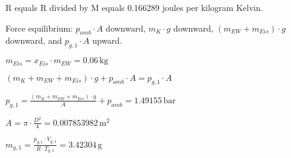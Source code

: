 R equals R divided by M equals 0.166289 joules per kilogram Kelvin.  

Force equilibrium:  
\( p_{amb} \cdot A \) downward, \( m_K \cdot g \) downward, \( (m_{EW} + m_{Eis}) \cdot g \) downward, and \( p_{g,1} \cdot A \) upward.  

\( m_{Eis} = x_{Eis} \cdot m_{EW} = 0.06 \, \text{kg} \)  

\( (m_K + m_{EW} + m_{Eis}) \cdot g + p_{amb} \cdot A = p_{g,1} \cdot A \)  

\( p_{g,1} = \frac{(m_K + m_{EW} + m_{Eis}) \cdot g}{A} + p_{amb} = 1.49155 \, \text{bar} \)  

\( A = \pi \cdot \frac{D^2}{4} = 0.007853982 \, \text{m}^2 \)  

\( m_{g,1} = \frac{p_{g,1} \cdot V_{g,1}}{R \cdot T_{g,1}} = 3.42304 \, \text{g} \)
